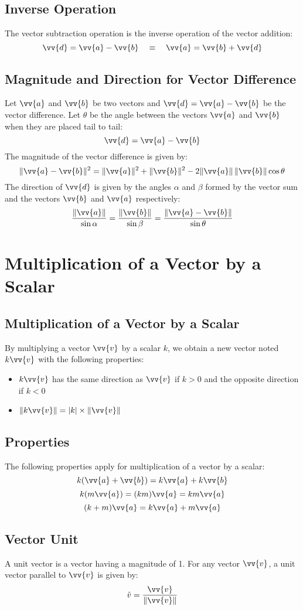 		\subsection{Inverse Operation}
			The vector subtraction operation is the inverse operation of the vector addition:
			\[\vv{d} = \vv{a} - \vv{b} \quad \equiv \quad \vv{a} = \vv{b} + \vv{d}\]
		\subsection{Magnitude and Direction for Vector Difference}
			Let $\vv{a}$ and $\vv{b}$ be two vectors and $\vv{d} = \vv{a} - \vv{b}$ be the vector difference. Let $\theta$ be the angle between the vectors $\vv{a}$ and $\vv{b}$ when they are placed tail to tail:
			\[\vv{d} = \vv{a} - \vv{b}\]
			The magnitude of the vector difference is given by:
			\[\|\vv{a} - \vv{b}\|^2 = \|\vv{a}\|^2 + \|\vv{b}\|^2 - 2\|\vv{a}\|\,\|\vv{b}\|\cos \theta\]
			The direction of $\vv{d}$ is given by the angles $\alpha$ and $\beta$ formed by the vector sum and the vectors $\vv{b}$ and $\vv{a}$ respectively:
			\[\frac{\|\vv{a}\|}{\sin\alpha} = \frac{\|\vv{b}\|}{\sin\beta} = \frac{\|\vv{a}-\vv{b}\|}{\sin\theta}\]
	\section{Multiplication of a Vector by a Scalar}
		\subsection{Multiplication of a Vector by a Scalar}
			By multiplying a vector $\vv{v}$ by a scalar $k$, we obtain a new vector noted $k\vv{v}$ with the following properties:
			\begin{itemize}
				\item $k\vv{v}$ has the same direction as $\vv{v}$ if $k > 0$ and the opposite direction if $k < 0$
				\item $\|k\vv{v}\| = |k| \times \|\vv{v}\|$
			\end{itemize}
		\subsection{Properties}
			The following properties apply for multiplication of a vector by a scalar:
			\[k(\vv{a} + \vv{b}) = k\vv{a} + k\vv{b}\]
			\[k(m\vv{a}) = (km)\vv{a} = km\vv{a}\]
			\[(k + m)\vv{a} = k\vv{a} + m\vv{a}\]
		\subsection{Vector Unit}
			A unit vector is a vector having a magnitude of 1. For any vector $\vv{v}$, a unit vector parallel to $\vv{v}$ is given by:
			\[\hat{v} = \frac{\vv{v}}{\|\vv{v}\|}\]
